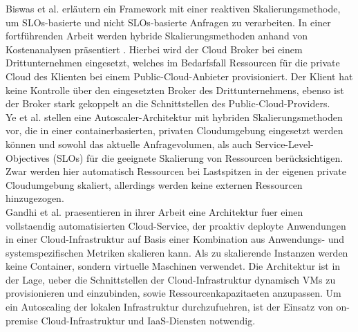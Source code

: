 \documentclass[runningheads]{llncs}
\begin{document}
Biswas et al. \cite{biswas_auto-scaling_2015} erläutern ein Framework mit einer reaktiven Skalierungsmethode, um SLOs-basierte und nicht SLOs-basierte Anfragen zu verarbeiten. In einer fortführenden Arbeit werden hybride Skalierungsmethoden anhand von Kostenanalysen präsentiert \cite{biswas_hybrid_2017}. Hierbei wird der Cloud Broker bei einem Drittunternehmen eingesetzt, welches im Bedarfsfall Ressourcen für die private Cloud des Klienten bei einem Public-Cloud-Anbieter provisioniert. Der Klient hat keine Kontrolle über den eingesetzten Broker des Drittunternehmens, ebenso ist der Broker stark gekoppelt an die Schnittstellen des Public-Cloud-Providers. \\
	
Ye et al. \cite{ye_auto-scaling_2017} stellen eine Autoscaler-Architektur mit hybriden Skalierungsmethoden vor, die in einer containerbasierten, privaten Cloudumgebung eingesetzt werden können und sowohl das aktuelle Anfragevolumen, als auch Service-Level-Objectives (SLOs) für die geeignete Skalierung von Ressourcen berücksichtigen. Zwar werden hier automatisch Ressourcen bei Lastspitzen in der eigenen private Cloudumgebung skaliert, allerdings werden  keine externen Ressourcen hinzugezogen. \\

Gandhi et al. \cite{gandhi_adaptive_nodate} praesentieren in ihrer Arbeit eine Architektur fuer einen vollstaendig automatisierten Cloud-Service, der proaktiv deployte Anwendungen in einer Cloud-Infrastruktur auf Basis einer Kombination aus Anwendungs- und systemspezifischen Metriken skalieren kann. Als zu skalierende Instanzen werden keine Container, sondern virtuelle Maschinen verwendet. Die Architektur ist in der Lage, ueber die Schnittstellen der Cloud-Infrastruktur dynamisch VMs zu provisionieren und einzubinden, sowie Ressourcenkapazitaeten anzupassen. Um ein Autoscaling der lokalen Infrastruktur durchzufuehren, ist der Einsatz von on-premise Cloud-Infrastruktur und IaaS-Diensten notwendig. \\
	
\end{document}
